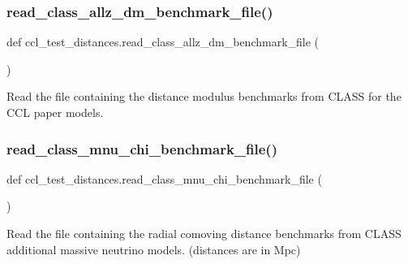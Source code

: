\subsubsection{\texorpdfstring{read\+\_\+class\+\_\+allz\+\_\+dm\+\_\+benchmark\+\_\+file()}{read\_class\_allz\_dm\_benchmark\_file()}}
{\footnotesize\ttfamily def ccl\+\_\+test\+\_\+distances.\+read\+\_\+class\+\_\+allz\+\_\+dm\+\_\+benchmark\+\_\+file (\begin{DoxyParamCaption}{ }\end{DoxyParamCaption})}

\begin{DoxyVerb}Read the file containing the distance modulus benchmarks from
CLASS for the CCL paper models.
\end{DoxyVerb}
 \mbox{\label{namespaceccl__test__distances_a715a30aba8dcfe6b8712ce86c815171e}} 
\subsubsection{\texorpdfstring{read\+\_\+class\+\_\+mnu\+\_\+chi\+\_\+benchmark\+\_\+file()}{read\_class\_mnu\_chi\_benchmark\_file()}}
{\footnotesize\ttfamily def ccl\+\_\+test\+\_\+distances.\+read\+\_\+class\+\_\+mnu\+\_\+chi\+\_\+benchmark\+\_\+file (\begin{DoxyParamCaption}{ }\end{DoxyParamCaption})}

\begin{DoxyVerb}Read the file containing the radial comoving distance benchmarks from
CLASS additional massive neutrino models. (distances are in Mpc)
\end{DoxyVerb}
 \mbox{\label{namespaceccl__test__distances_a3c41444e8d68b50c2d1465464e08b5e2}} 
